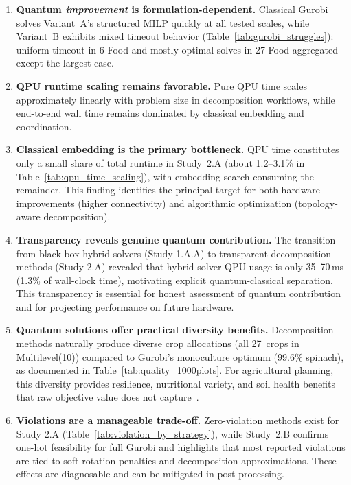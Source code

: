 \documentclass{oqireport}
\begin{document}
\begin{enumerate}
    \item \textbf{Quantum \textit{improvement} is formulation-dependent.} Classical Gurobi solves Variant~A's structured MILP quickly at all tested scales, while Variant~B exhibits mixed timeout behavior (Table~\ref{tab:gurobi_struggles}): uniform timeout in 6-Food and mostly optimal solves in 27-Food aggregated except the largest case.

    \item \textbf{QPU runtime scaling remains favorable.} Pure QPU time scales approximately linearly with problem size in decomposition workflows, while end-to-end wall time remains dominated by classical embedding and coordination.

    \item \textbf{Classical embedding is the primary bottleneck.} QPU time constitutes only a small share of total runtime in Study~2.A (about 1.2--3.1\% in Table~\ref{tab:qpu_time_scaling}), with embedding search consuming the remainder. This finding identifies the principal target for both hardware improvements (higher connectivity) and algorithmic optimization (topology-aware decomposition).

    \item \textbf{Transparency reveals genuine quantum contribution.} The transition from black-box hybrid solvers (Study 1.A.A) to transparent decomposition methods (Study 2.A) revealed that hybrid solver QPU usage is only 35--70\,ms (1.3\% of wall-clock time), motivating explicit quantum-classical separation. This transparency is essential for honest assessment of quantum contribution and for projecting performance on future hardware.

    \item \textbf{Quantum solutions offer practical diversity benefits.} Decomposition methods naturally produce diverse crop allocations (all 27~crops in Multilevel(10)) compared to Gurobi's monoculture optimum (99.6\% spinach), as documented in Table~\ref{tab:quality_1000plots}. For agricultural planning, this diversity provides resilience, nutritional variety, and soil health benefits that raw objective value does not capture~\cite{lin2011resilience, bowles2020longterm}.

    \item \textbf{Violations are a manageable trade-off.} Zero-violation methods exist for Study 2.A (Table~\ref{tab:violation_by_strategy}), while Study~2.B confirms one-hot feasibility for full Gurobi and highlights that most reported violations are tied to soft rotation penalties and decomposition approximations. These effects are diagnosable and can be mitigated in post-processing.


\end{enumerate}
\end{document}
